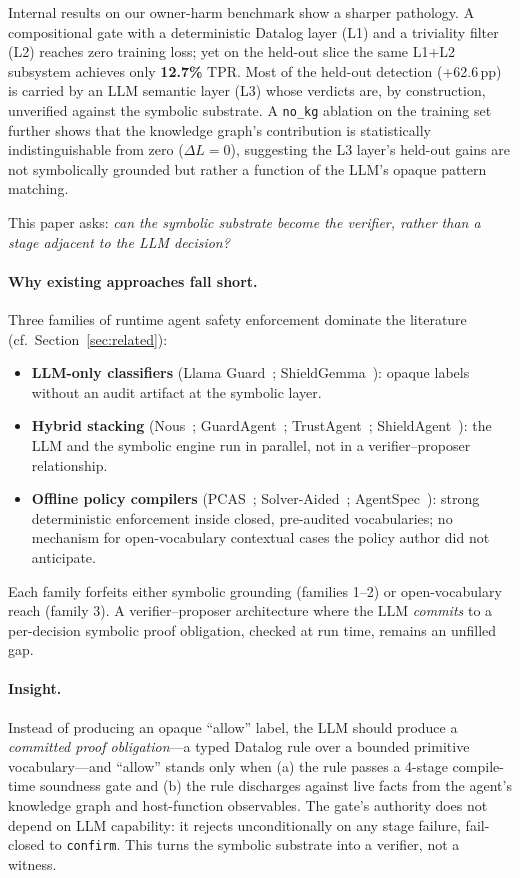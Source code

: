 \documentclass{article}
\theoremstyle{definition}
\begin{document}
Internal results on our owner-harm benchmark show a sharper pathology.
A compositional gate with a deterministic Datalog layer (L1) and a
triviality filter (L2) reaches zero training loss; yet on the held-out
slice the same L1+L2 subsystem achieves only \textbf{12.7\%} TPR. Most
of the held-out detection (+62.6\,pp) is carried by an LLM semantic
layer (L3) whose verdicts are, by construction, unverified against the
symbolic substrate. A \texttt{no\_kg} ablation on the training set
further shows that the knowledge graph's contribution is statistically
indistinguishable from zero ($\Delta L = 0$), suggesting the L3
layer's held-out gains are not symbolically grounded but rather a
function of the LLM's opaque pattern matching.

This paper asks: \emph{can the symbolic substrate become the verifier,
rather than a stage adjacent to the LLM decision?}

\paragraph{Why existing approaches fall short.}
Three families of runtime agent safety enforcement dominate the
literature (cf.\ Section~\ref{sec:related}):
\begin{itemize}[leftmargin=1.5em]
\item \textbf{LLM-only classifiers}
(Llama Guard~\citep{inan2023llamaguard};
ShieldGemma~\citep{zeng2024shieldgemma}): opaque labels without an audit
artifact at the symbolic layer.
\item \textbf{Hybrid stacking} (Nous~\citep{zhang2026ownerharm};
GuardAgent~\citep{xiang2024guardagent};
TrustAgent~\citep{hua2024trustagent};
ShieldAgent~\citep{chen2025shieldagent}): the LLM and the symbolic
engine run in parallel, not in a verifier--proposer relationship.
\item \textbf{Offline policy compilers}
(PCAS~\citep{palumbo2026pcas}; Solver-Aided~\citep{roy2026solveraided};
AgentSpec~\citep{wang2026agentspec}): strong deterministic enforcement
inside closed, pre-audited vocabularies; no mechanism for
open-vocabulary contextual cases the policy author did not anticipate.
\end{itemize}
Each family forfeits either symbolic grounding (families 1--2) or
open-vocabulary reach (family 3). A verifier--proposer architecture
where the LLM \emph{commits} to a per-decision symbolic proof
obligation, checked at run time, remains an unfilled gap.

\paragraph{Insight.}
Instead of producing an opaque ``allow'' label, the LLM should produce
a \emph{committed proof obligation}---a typed Datalog rule over a
bounded primitive vocabulary---and ``allow'' stands only when (a) the
rule passes a 4-stage compile-time soundness gate and (b) the rule
discharges against live facts from the agent's knowledge graph and
host-function observables. The gate's authority does not depend on
LLM capability: it rejects unconditionally on any stage failure,
fail-closed to \texttt{confirm}. This turns the symbolic substrate
into a verifier, not a witness.
\end{document}
